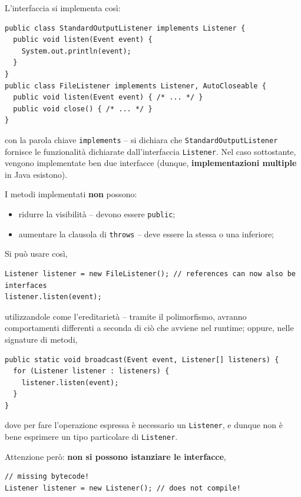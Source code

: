 \documentclass[\fontsizeclass,twocolumn]{\classname}
\theoremstyle{definition}
\theoremstyle{definition}
\begin{document}
L'interfaccia si implementa così:

\begin{lstlisting}
public class StandardOutputListener implements Listener {
  public void listen(Event event) {
    System.out.println(event);
  }
}
public class FileListener implements Listener, AutoCloseable {
  public void listen(Event event) { /* ... */ }
  public void close() { /* ... */ }
}
\end{lstlisting}
con la parola chiave \texttt{implements} -- si dichiara che
\texttt{StandardOutputListener} fornisce le funzionalità dichiarate
dall'interfaccia \texttt{Listener}. Nel caso sottostante, vengono implementate
ben due interfacce (dunque, \textbf{implementazioni multiple} in Java
esistono).

I metodi implementati \textbf{non} possono:
\begin{itemize}
    \item ridurre la visibilità -- devono essere \texttt{public};
    \item aumentare la clausola di \texttt{throws} -- deve essere la stessa o
        una inferiore;
\end{itemize}

Si può usare così,

\begin{lstlisting}
Listener listener = new FileListener(); // references can now also be interfaces
listener.listen(event);
\end{lstlisting}

utilizzandole come l'ereditarietà -- tramite il polimorfismo, avranno
comportamenti differenti a seconda di ciò che avviene nel runtime; oppure,
nelle signature di metodi,

\begin{lstlisting}
public static void broadcast(Event event, Listener[] listeners) {
  for (Listener listener : listeners) {
    listener.listen(event);
  }
}
\end{lstlisting}

dove per fare l'operazione espressa è necessario un \texttt{Listener}, e dunque
non è bene esprimere un tipo particolare di \texttt{Listener}.

Attenzione però: \textbf{non si possono istanziare le interfacce},

\begin{lstlisting}
// missing bytecode!
Listener listener = new Listener(); // does not compile!
\end{lstlisting}
\end{document}
